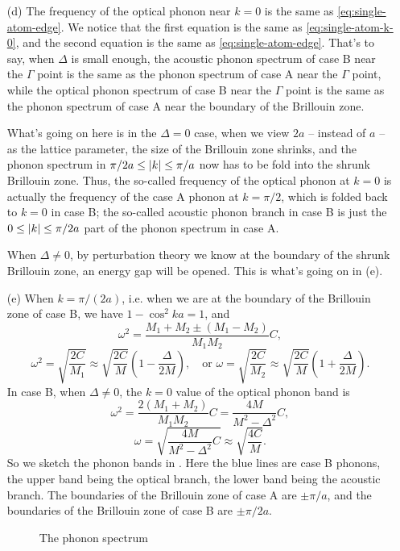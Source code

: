 \documentclass[hyperref, a4paper]{article}
\begin{document}
\begin{itemize}
\item[(d)] The frequency of the optical phonon near $k=0$ is the same as \eqref{eq:single-atom-edge}.
We notice that the first equation is the same as \eqref{eq:single-atom-k-0},
and the second equation is the same as \eqref{eq:single-atom-edge}.
That's to say, when $\Delta$ is small enough,
the acoustic phonon spectrum of case B near the $\Gamma$ point 
is the same as the phonon spectrum of case A near the $\Gamma$ point,
while the optical phonon spectrum of case B near the $\Gamma$ point 
is the same as the phonon spectrum of case A near the boundary of the Brillouin zone.

What's going on here is in the $\Delta = 0$ case, 
when we view $2a$ -- instead of $a$ -- 
as the lattice parameter,
the size of the Brillouin zone shrinks,
and the phonon spectrum in $\pi / 2a \leq \abs{k} \leq \pi / a$
now has to be fold into the shrunk Brillouin zone.
Thus, the so-called frequency of the optical phonon at $k=0$ is actually 
the frequency of the case A phonon at $k = \pi / 2$,
which is folded back to $k=0$ in case B;
the so-called acoustic phonon branch in case B 
is just the $0 \leq \abs{k} \leq \pi / 2a$ part of the phonon spectrum in case A.

When $\Delta \neq 0$,
by perturbation theory we know at the boundary of the shrunk Brillouin zone,
an energy gap will be opened.
This is what's going on in (e).

\item[(e)] When $k = \pi / (2a)$, i.e. when we are at the boundary of the Brillouin zone of case B,
we have $1 - \cos^2 ka = 1$, and 
\[
    \omega^2 = \frac{M_1 + M_2 \pm (M_1 - M_2)}{M_1 M_2} C,
\]
\begin{equation}
    \omega^2 = \sqrt{\frac{2 C}{M_1}} \approx \sqrt{\frac{2C}{M}} 
    \left(1 - \frac{\Delta}{2M} \right), \quad 
    \text{or } \omega = \sqrt{\frac{2C}{M_2}} \approx \sqrt{\frac{2C}{M}} \left( 1 + \frac{\Delta}{2M} \right).
\end{equation}
In case B, when $\Delta \neq 0$, the $k=0$ value of the optical phonon band is 
\[
    \omega^2 = \frac{2 (M_1 + M_2)}{M_1 M_2} C = \frac{4 M}{M^2 - \Delta^2} C ,
\]
\begin{equation}
    \omega = \sqrt{\frac{4 M}{M^2 - \Delta^2} C} \approx \sqrt{\frac{4 C}{M}}.
\end{equation}
So we sketch the phonon bands in .
Here the blue lines are case B phonons,
the upper band being the optical branch,
the lower band being the acoustic branch.
The boundaries of the Brillouin zone of case A are $\pm \pi / a$,
and the boundaries of the Brillouin zone of case B are $\pm \pi / 2a$.

\begin{figure}
    \centering
    
    \caption{The phonon spectrum}
    \label{fig:phonon-spectrum}
\end{figure}

\end{itemize}
\end{document}

